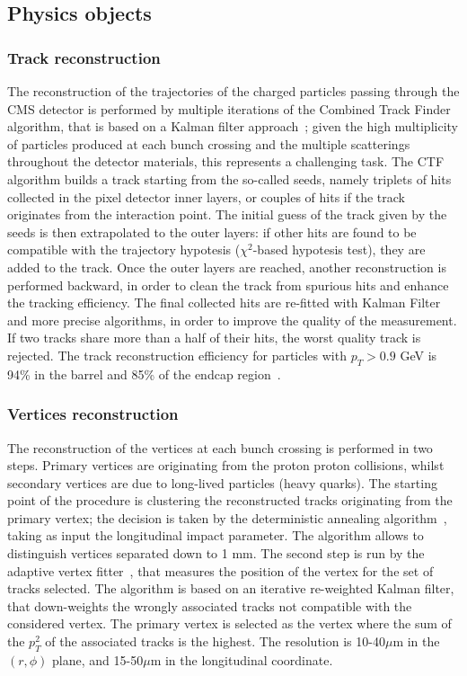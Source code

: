 \subsection{Physics objects}

\subsubsection{Track reconstruction}
The reconstruction of the trajectories of the charged particles passing through the CMS detector is performed by multiple iterations of the Combined Track Finder algorithm, that is based on a Kalman filter approach~\cite{Fruhwirth:1987fm}; given the high multiplicity of particles produced at each bunch crossing and the multiple scatterings throughout the detector materials, this represents a challenging task. The CTF algorithm builds a track starting from the so-called seeds, namely triplets of hits collected in the pixel detector inner layers, or couples of hits if the track originates from the interaction point. The initial guess of the track given by the seeds is then extrapolated to the outer layers: if other hits are found to be compatible with the trajectory hypotesis ($\chi^2$-based hypotesis test), they are added to the track. Once the outer layers are reached, another reconstruction is performed backward, in order to clean the track from spurious hits and enhance the tracking efficiency. The final collected hits are re-fitted with Kalman Filter and more precise algorithms, in order to improve the quality of the measurement. If two tracks share more than a half of their hits, the worst quality track is rejected. The track reconstruction efficiency for particles with $p_T >0.9$ GeV is 94\% in the barrel and 85\% of the endcap region~\cite{Chatrchyan:2014fea}.\\


\subsubsection{Vertices reconstruction}
The reconstruction of the vertices at each bunch crossing is performed in two steps. Primary vertices are originating from the proton proton collisions, whilst secondary vertices are due to long-lived particles (heavy quarks). The starting point of the procedure is clustering the reconstructed tracks originating from the primary vertex; the decision is taken by the deterministic annealing algorithm~\cite{bib:detanneal}, taking as input the longitudinal impact parameter. The algorithm allows to distinguish vertices separated down to 1 mm. The second step is run by the adaptive vertex fitter~\cite{Fruhwirth:2007hz}, that measures the position of the vertex for the set of tracks selected. The algorithm is based on an iterative re-weighted Kalman filter, that down-weights the wrongly associated tracks not compatible with the considered vertex. The primary vertex is selected as the vertex where the sum of the $p_T^2$ of the associated tracks is the highest. The resolution is 10-40$\mu$m in the $(r, \phi)$ plane, and 15-50$\mu$m in the longitudinal coordinate.

